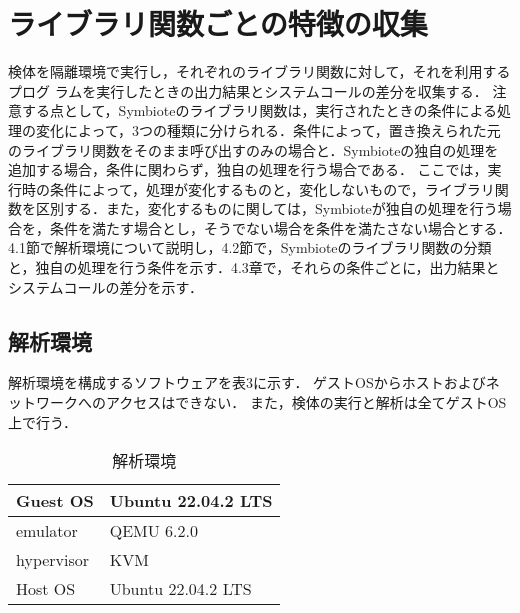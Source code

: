 \documentclass[submit,techreq,noauthor]{eco}	%
\begin{document}
\section{ライブラリ関数ごとの特徴の収集}
検体を隔離環境で実行し，それぞれのライブラリ関数に対して，それを利用するプログ
ラムを実行したときの出力結果とシステムコールの差分を収集する．
注意する点として，Symbioteのライブラリ関数は，実行されたときの条件による処理の変化によって，3つの種類に分けられる．条件によって，置き換えられた元のライブラリ関数をそのまま呼び出すのみの場合と．Symbioteの独自の処理を追加する場合，条件に関わらず，独自の処理を行う場合である．
ここでは，実行時の条件によって，処理が変化するものと，変化しないもので，ライブラリ関数を区別する．また，変化するものに関しては，Symbioteが独自の処理を行う場合を，条件を満たす場合とし，そうでない場合を条件を満たさない場合とする．\\
\indent
4.1節で解析環境について説明し，4.2節で，Symbioteのライブラリ関数の分類と，独自の処理を行う条件を示す．4.3章で，それらの条件ごとに，出力結果とシステムコールの差分を示す．

\subsection{解析環境}
解析環境を構成するソフトウェアを表3に示す．
ゲストOSからホストおよびネットワークへのアクセスはできない．
また，検体の実行と解析は全てゲストOS上で行う．

\begin{table}[t]
  \caption{解析環境}
  \label{table: 解析環境}
  \centering
  \begin{tabular}{|l|l|}
  \hline
  Guest OS   & Ubuntu 22.04.2 LTS \\ \hline
  emulator   & QEMU 6.2.0         \\ \hline
  hypervisor & KVM                \\ \hline
  Host OS    & Ubuntu 22.04.2 LTS \\ \hline
  \end{tabular}
\end{table}
\end{document}
